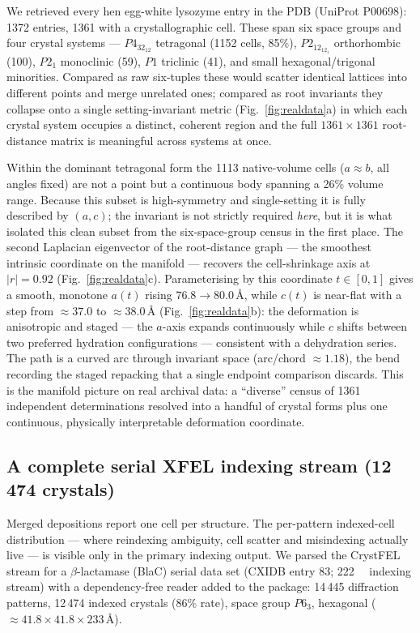 \documentclass[11pt]{article}
\newcommand{\Ang}{\text{\AA}}
\begin{document}
We retrieved every hen egg-white lysozyme entry in the PDB (UniProt P00698):
1372 entries, 1361 with a crystallographic cell. These span six space groups and
four crystal systems --- $P4_32_12$ tetragonal (1152 cells, 85\%),
$P2_12_12_1$ orthorhombic (100), $P2_1$ monoclinic (59), $P1$ triclinic (41),
and small hexagonal/trigonal minorities. Compared as raw six-tuples these would
scatter identical lattices into different points and merge unrelated ones;
compared as root invariants they collapse onto a single setting-invariant metric
(Fig.~\ref{fig:realdata}a) in which each crystal system occupies a distinct,
coherent region and the full $1361 \times 1361$ root-distance matrix is
meaningful across systems at once.

Within the dominant tetragonal form the 1113 native-volume cells
($a \approx b$, all angles fixed) are not a point but a continuous body spanning
a 26\% volume range. Because this subset is high-symmetry and single-setting it
is fully described by $(a, c)$; the invariant is not strictly required
\emph{here}, but it is what isolated this clean subset from the six-space-group
census in the first place. The second Laplacian eigenvector of the root-distance
graph --- the smoothest intrinsic coordinate on the manifold --- recovers the
cell-shrinkage axis at $|r| = 0.92$ (Fig.~\ref{fig:realdata}c). Parameterising by
this coordinate $t \in [0, 1]$ gives a smooth, monotone $a(t)$ rising
$76.8 \rightarrow 80.0\,\Ang$, while $c(t)$ is near-flat with a step from
$\approx 37.0$ to $\approx 38.0\,\Ang$ (Fig.~\ref{fig:realdata}b): the
deformation is anisotropic and staged --- the $a$-axis expands continuously
while $c$ shifts between two preferred hydration configurations --- consistent
with a dehydration series. The path is a curved arc through invariant space
(arc/chord $\approx 1.18$), the bend recording the staged repacking that a single
endpoint comparison discards. This is the manifold picture on real archival data:
a ``diverse'' census of 1361 independent determinations resolved into a handful
of crystal forms plus one continuous, physically interpretable deformation
coordinate.

\subsection{A complete serial XFEL indexing stream (12\,474 crystals)}

Merged depositions report one cell per structure. The per-pattern indexed-cell
distribution --- where reindexing ambiguity, cell scatter and misindexing
actually live --- is visible only in the primary indexing output. We parsed the
CrystFEL stream for a $\beta$-lactamase (BlaC) serial data set (CXIDB entry 83;
\SI{222}{\mega\byte} indexing stream) with a dependency-free reader added to the
package: 14\,445 diffraction patterns, 12\,474 indexed crystals (86\% rate),
space group $P6_3$, hexagonal ($\approx 41.8 \times 41.8 \times 233\,\Ang$).
\end{document}
